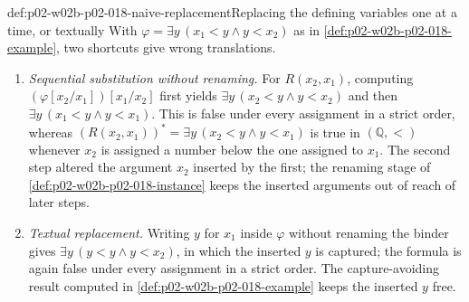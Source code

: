 \begin{hbwarning}{def:p02-w02b-p02-018-naive-replacement}{Replacing the defining variables one at a time, or textually}
With \(\varphi=\exists y\,(x_1<y\land y<x_2)\) as in
\cref{def:p02-w02b-p02-018-example}, two shortcuts give wrong
translations.
\begin{enumerate}
 \item \emph{Sequential substitution without renaming.}  For
       \(R(x_2,x_1)\), computing \((\varphi[x_2/x_1])[x_1/x_2]\) first
       yields \(\exists y\,(x_2<y\land y<x_2)\) and then
       \(\exists y\,(x_1<y\land y<x_1)\).  This is false under every
       assignment in a strict order, whereas
       \((R(x_2,x_1))^{*}=\exists y\,(x_2<y\land y<x_1)\) is true in
       \((\mathbb Q,<)\) whenever \(x_2\) is assigned a number below the one
       assigned to \(x_1\).
       The second step altered the argument \(x_2\) inserted by the first;
       the renaming stage of \cref{def:p02-w02b-p02-018-instance} keeps the
       inserted arguments out of reach of later steps.
 \item \emph{Textual replacement.}  Writing \(y\) for \(x_1\) inside
       \(\varphi\) without renaming the binder gives
       \(\exists y\,(y<y\land y<x_2)\), in which the inserted \(y\) is
       captured; the formula is again false under every assignment in a
       strict order.  The capture-avoiding result computed in
       \cref{def:p02-w02b-p02-018-example} keeps the inserted \(y\) free.
\end{enumerate}
\end{hbwarning}

